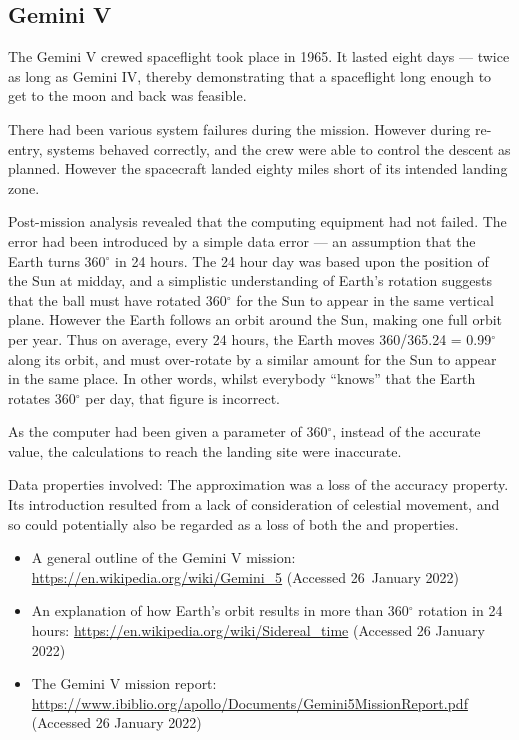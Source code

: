 \subsection{Gemini V}\label{bkm:incacc:geminiV}
The Gemini V crewed spaceflight took place in 1965. It lasted eight days --- twice as long as Gemini IV, thereby demonstrating that a spaceflight long enough to get to the moon and back was feasible.

There had been various system failures during the mission. However during re-entry, systems behaved correctly, and the crew were able to control the descent as planned. However the spacecraft landed eighty miles short of its intended landing zone.

Post-mission analysis revealed that the computing equipment had not failed. The error had been introduced by a simple data error ---
an assumption that the Earth turns 360$^\circ$ in 24 hours. The 24 hour day was based upon the position of the Sun at midday,
and a simplistic understanding of Earth's rotation suggests that the ball must have rotated 360$^\circ$ for the Sun to appear in the same vertical plane. However the Earth follows an orbit around the Sun, making one full orbit per year.
Thus on average, every 24 hours, the Earth moves 360/365.24 = 0.99$^\circ$ along its orbit,
and must over-rotate by a similar amount for the Sun to appear in the same place.
In other words, whilst everybody ``knows'' that the Earth rotates 360$^\circ$ per day, that figure is incorrect.

As the computer had been given a parameter of 360$^\circ$, instead of the accurate value, the calculations to reach the landing site were inaccurate.

Data properties involved: The approximation was a loss of the \gls{accuracy} property.
Its introduction resulted from a lack of consideration of celestial movement,
and so could potentially also be regarded as a loss of both the  and  properties.

\begin{itemize}
\item A general outline of the Gemini V mission:
  \href{https://en.wikipedia.org/wiki/Gemini\_5}
       {https://en.wikipedia.org/wiki/Gemini\_5}
       (Accessed 26~January 2022)
     \item An explanation of how Earth's orbit results in more than 360$^\circ$ rotation in 24 hours: 
       \href{https://en.wikipedia.org/wiki/Sidereal\_time}
            {https://en.wikipedia.org/wiki/Sidereal\_time}
       (Accessed 26 January 2022)
          \item The Gemini V mission report:
            \href{https://www.ibiblio.org/apollo/Documents/Gemini5MissionReport.pdf}
                 {https://www.ibiblio.org/apollo/Documents/Gemini5MissionReport.pdf}
       (Accessed 26 January 2022)
\end{itemize}

